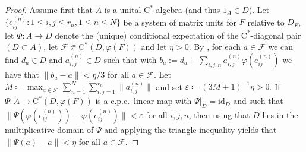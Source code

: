 \documentclass[11pt,a4paper]{amsart}
\theoremstyle{definition}
\numberwithin{equation}{section}
\newcommand{\mc}[1]{\mathcal{#1}}
\begin{document}
\begin{proof}
Assume first that $A$ is a unital $\mathrm{C}^\ast$-algebra (and thus $1_A\in D$). Let $\{e_{ij}^{(n)}: 1\le i,j\le r_n, 1\le n\le N\}$ be a system of matrix units for $F$ relative to $D_F$, let $\Phi\colon A\to D$ denote the (unique) conditional expectation of the $\mathrm{C}^\ast$-diagonal pair $(D\subset A)$, let $\mathcal{F}\Subset\mathrm{C}^\ast(D,\varphi(F))$ and let $\eta>0$. By , for each $a\in\mc{F}$ we can find $d_a\in D$ and $a_{i,j}^{(n)}\in D$ such that with $b_a:=d_a+\sum_{i,j,n}a_{i,j}^{(n)}\varphi(e_{ij}^{(n)})$ we have that $\|b_a -a \|<\eta/3$ for all $a\in\mc{F}$. Let $M\coloneqq \max_{a\in\mc{F}}\sum_{n=1}^N\sum_{i,j=1}^{r_n}\|a_{i,j}^{(n)}\|$ and set $\varepsilon\coloneqq (3M+1)^{-1}\eta>0$. If $\Psi\colon A\to\mathrm{C}^\ast(D,\varphi(F))$ is a c.p.c.\ linear map with $\Psi\vert_D=\mathrm{id}_D$ and such that $\|\Psi(\varphi(e_{ij}^{(n)}))-\varphi(e_{ij}^{(n)})\|<\varepsilon$ for all $i,j,n$, then using that $D$ lies in the multiplicative domain of $\Psi$ and applying the triangle inequality yields that $\|\Psi(a)-a\|<\eta$ for all $a\in\mc{F}$.


\end{proof}
\end{document}
